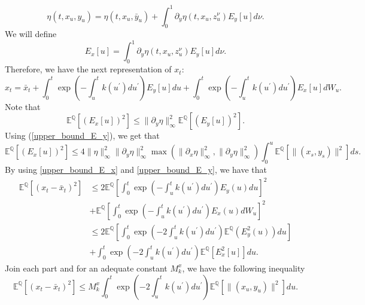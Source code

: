 \documentclass[a4paper,10pt]{article}
\newcommand{\1}{\mathbf{1}}
\begin{document}
\begin{equation*}
\eta(t,x_u,y_u) = \eta(t,x_u,\bar{y}_u) + \int_{0}^{1}\partial_y\eta(t,x_u,z^{\nu}_{u}) E_{y}[u] d\nu.
\end{equation*}
We will define 
\begin{equation*}
E_{x}\left[u\right] = \int_{0}^{1}\partial_y\eta(t,x_u,z^{\nu}_{u}) E_{y}[u] d\nu. 
\end{equation*}
Therefore, we have the next representation of $x_t$:
\begin{equation*}
x_t = \bar{x}_t + \int_{0}^{t} \exp\left(- \int_{u}^{t} k(u^{\prime}) du^{\prime}\right) E_{y}[u] du + \int_{0}^{t} \exp\left(- \int_{u}^{t} k(u^{\prime}) du^{\prime}\right) E_{x}[u] dW_u.
\end{equation*}
Note that
\begin{equation*}
 \mathbb{E}^{\mathbb{Q}}[(E_x[u])^{2}] \leq \|\partial_y \eta \|^{2}_{\infty} \mathbb{E}^{\mathbb{Q}}[(E_{y}[u])^{2}]. 
\end{equation*}
Using (\ref{upper_bound_E_y}), we get that
\begin{equation}\label{upper_bound_E_x}
 \mathbb{E}^{\mathbb{Q}}[(E_x[u])^{2}] \leq 4 \|\eta\|^{2}_{\infty} \|\partial_y \eta\|^{2}_{\infty} \max(\|\partial_x\eta\|^{2}_{\infty},\|\partial_y \eta\|^{2}_{\infty} ) \int_{0}^{u} \mathbb{E}^{\mathbb{Q}}\left[ \|(x_s, y_s)\|^{2}\right] ds.
\end{equation}
By using \eqref{upper_bound_E_x} and \eqref{upper_bound_E_y}, we have that 
\begin{align*}
\mathbb{E}^{\mathbb{Q}}[(x_t - \bar{x}_t)^{2}] & \leq 2 \mathbb{E}^{\mathbb{Q}}\left[ \int_{0}^{t} \exp\left(- \int_{u}^{t} k(u^{\prime}) du^{\prime}\right) E_{y}(u) du    \right]^2\\
&+ \mathbb{E}^{\mathbb{Q}}\left[ \int_{0}^{t} \exp\left(- \int_{u}^{t} k(u^{\prime}) du^{\prime}\right) E_{x}(u) dW_u\right]^{2} \\
&\leq 2 \mathbb{E}^{\mathbb{Q}}\left[\int_{0}^{t} \exp\left(- 2\int_{u}^{t} k(u^{\prime}) du^{\prime}\right) \mathbb{E}^{\mathbb{Q}}(E^{2}_{y}(u)) du\right]\\
&+ \int_{0}^{t} \exp\left(- 2\int_{u}^{t} k(u^{\prime}) du^{\prime}\right) \mathbb{E}^{\mathbb{Q}}[E^{2}_{x}[u]] du. 
\end{align*}
Join each part and for an adequate constant $M^{x}_k$, we have the following inequality 
\begin{equation*}
\mathbb{E}^{\mathbb{Q}}[(x_t - \bar{x}_t)^{2}]\leq M^{x}_k \int_{0}^{t} \exp\left(- 2\int_{u}^{t} k(u^{\prime}) du^{\prime}\right) \mathbb{E}^{\mathbb{Q}}\left[ \|(x_u, y_u)\|^{2}\right] du.
\end{equation*}
\end{document}
